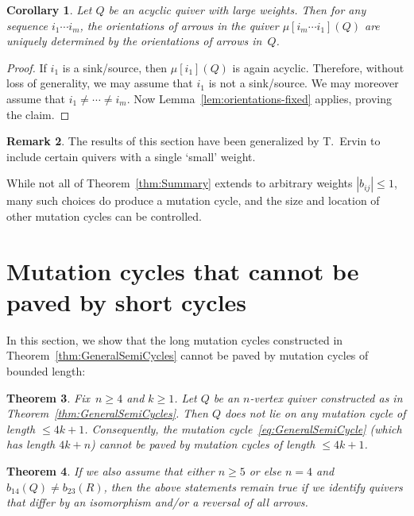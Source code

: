 \documentclass[11pt, letterpaper]{amsart}
\newtheorem{theorem}{Theorem}[section]
\newtheorem{corollary}[theorem]{Corollary}
\theoremstyle{definition}
\newtheorem{remark}[theorem]{Remark}
\numberwithin{equation}{section}
\newcommand{\T}[2]{\mu[#1](#2)} %
\begin{document}
\begin{corollary}
\label{cor:orientations-fixed}
Let $Q$ be an acyclic quiver with large weights. 
Then for any sequence $i_1\cdots i_m$, 
the orientations of arrows in the quiver $\T{i_m\cdots i_1}{Q}$ are uniquely determined by 
the orientations of arrows in~$Q$. 
\end{corollary}

\begin{proof}
If $i_1$ is a sink/source, then $\mu[i_1](Q)$ is again acyclic. 
Therefore, without loss of generality, we may assume that $i_1$ is not a sink/source. 
We may moreover assume that  $i_1\neq \cdots\neq i_m$. 
Now Lemma~\ref{lem:orientations-fixed} applies, proving the claim. 
\end{proof}

\begin{remark}
The results of this section have been generalized by T.~Ervin \cite{ervinPrefork} to include certain quivers with a single `small' weight. 

While not all of Theorem~\ref{thm:Summary} extends to arbitrary weights $|b_{ij}| \le 1$, 
many such choices do produce a mutation cycle, and the size and location of other mutation cycles can be controlled.
\end{remark}

\newpage

\section{Mutation cycles that cannot be paved by short cycles}
\label{Sec:primitiveCycles}

In this section, we show that the long mutation cycles constructed in Theorem~\ref{thm:GeneralSemiCycles}
cannot be paved by mutation cycles of bounded length: 

\begin{theorem}
\label{thm:primitive}
Fix~$n \geq 4$ and $k\ge 1$. 
Let $Q$ be an $n$-vertex quiver constructed as in Theorem~\ref{thm:GeneralSemiCycles}.
Then $Q$ does not lie on any mutation cycle of length $\le 4k+1$. 
Consequently, the mutation cycle~\eqref{eq:GeneralSemiCycle} 
(which has length $4k+n$) cannot be paved by mutation cycles of length $\le 4k+1$. 
\end{theorem}

\begin{theorem}
\label{thm:primitive-nonisom}
If we also assume that either $n\ge 5$ or  else $n=4$ and ${b_{14}(Q) \neq b_{23}(R)}$,  
then the above statements remain true if we identify quivers that differ by an isomorphism and/or a reversal of all arrows.
\end{theorem}
\end{document}
